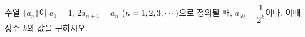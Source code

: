 수열 $\{a_n\}$이 $a_1=1$, $2a_{n+1}=a_n$ $(n=1{,}\mkern3mu\mathopen{}2{,}\mkern3mu\mathopen{}3{,}\mkern3mu\mathopen{}\cdots)$으로 정의될 때, $a_{50}=\dfrac{1}{2^k}$이다. 이때 상수 $k$의 값을 구하시오.
